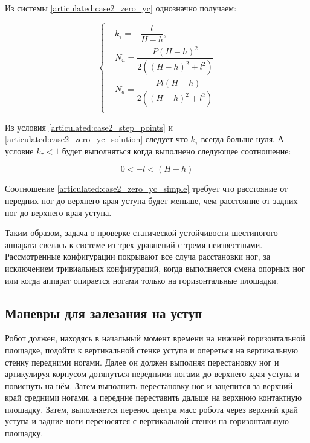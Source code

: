 Из системы \ref{articulated:case2_zero_yc} однозначно получаем:

\begin{equation}
\label{articulated:case2_zero_yc_solution}
\left\{
\begin{alignedat}{3}
&k_\tau = -\dfrac{l}{H-h},\\
&N_u = \dfrac{P(H-h)^2}{2((H-h)^2+l^2)}\\
&N_d = \dfrac{-Pl(H - h)}{2((H-h)^2+l^2)}\\
\end{alignedat}
\right.
\end{equation}

Из условия \ref{articulated:case2_step_points} и \ref{articulated:case2_zero_yc_solution} следует что $k_\tau$ всегда больше нуля. А условие $k_\tau < 1$ будет выполняться когда выполнено следующее соотношение:

\begin{equation}
\label{articulated:case2_zero_yc_simple}
  0 < -l < (H-h)
\end{equation}

Соотношение \ref{articulated:case2_zero_yc_simple} требует что расстояние от передних ног до верхнего края уступа будет меньше, чем расстояние от задних ног до верхнего края уступа.

Таким образом, задача о проверке статической устойчивости шестиногого аппарата свелась к системе из трех уравнений с тремя неизвестными. Рассмотренные конфигурации покрывают все случа расстановки ног, за исключением тривиальных конфигураций, когда выполняется смена опорных ног или когда аппарат опирается ногами только на горизонтальные площадки.

\subsection{Маневры для залезания на уступ}

Робот должен, находясь в начальный момент времени на нижней горизонтальной площадке, подойти к вертикальной стенке уступа и опереться на вертикальную стенку передними ногами. Далее он должен выполняя перестановку ног и артикулируя корпусом дотянуться передними ногами до верхнего края уступа и повиснуть на нём. Затем выполнить перестановку ног и зацепится за верхний край средними ногами, а передние переставить дальше на верхнюю контактную площадку. Затем, выполняется перенос центра масс робота через верхний край уступа и задние ноги переносятся с вертикальной стенки на горизонтальную площадку.

